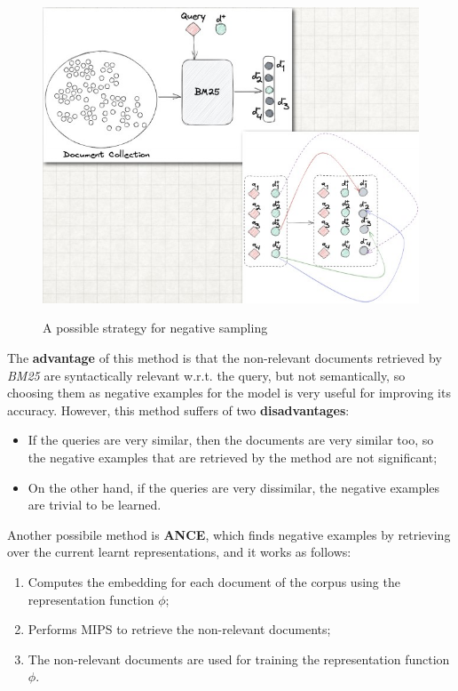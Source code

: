 \begin{figure}[h!]
		\centering
		\includegraphics[scale = 1.8]{img/negative sampling 1.jpg}
        \label{negative 1}
        \caption{A possible strategy for negative sampling}
\end{figure}

The \textbf{advantage} of this method is that the non-relevant documents retrieved by \textit{BM25} are syntactically relevant w.r.t. the query, but not semantically, so choosing them as negative examples for the model is very useful for improving its accuracy. However, this method suffers of two \textbf{disadvantages}:

\begin{itemize}
    \item If the queries are very similar, then the documents are very similar too, so the negative examples that are retrieved by the method are not significant;
    \item On the other hand, if the queries are very dissimilar, the negative examples are trivial to be learned.
\end{itemize}


Another possibile method is \textbf{ANCE}, which finds negative examples by retrieving over the current learnt representations, and it works as follows:

\begin{enumerate}
    \item Computes the embedding for each document of the corpus using the representation function $\phi$;
    \item Performs MIPS to retrieve the non-relevant documents;
    \item The non-relevant documents are used for training the representation function $\phi$.
\end{enumerate}

